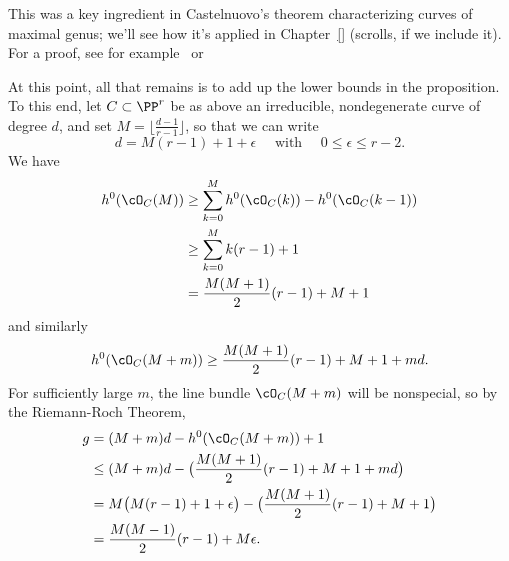 This was a key ingredient in Castelnuovo's theorem characterizing curves of maximal genus; we'll see how it's applied in Chapter~\ref{} (scrolls, if we include it). For a proof, see for example~\cite{ACGH} or~\cite{Montreal}

At this point, all that remains is to add up the lower bounds in the proposition. To this end, let $C \subset \PP^r$ be as above an irreducible, nondegenerate curve of degree $d$, and set $M = \lfloor{\frac{d-1}{r-1}}\rfloor$, so that we can write
$$
d = M(r-1) + 1 + \epsilon \quad \text{ with } \quad 0 \leq \epsilon \leq r-2.
$$
We have 
\begin{align*}
h^0(\cO_C(M)) &\geq \sum_{k=0}^M h^0(\cO_C(k)) - h^0(\cO_C(k-1)) \\
&\geq  \sum_{k=0}^M k(r-1)+1 \\
&= \frac{M(M+1)}{2}(r-1) + M + 1
\end{align*}
and similarly
$$
h^0(\cO_C(M+m)) \geq \frac{M(M+1)}{2}(r-1) + M + 1 + md.
$$
For sufficiently large $m$, the line bundle $\cO_C(M+m)$ will be nonspecial, so by the Riemann-Roch Theorem,
\begin{align*}
g &= (M+m)d - h^0(\cO_C(M+m)) + 1 \\
&\leq (M+m)d - \bigl(  \frac{M(M+1)}{2}(r-1) + M + 1 + md \bigr) \\
& = M\bigl( M(r-1) + 1 + \epsilon \bigr) - \bigl(  \frac{M(M+1)}{2}(r-1) + M + 1 \bigr) \\
&= \frac{M(M-1)}{2}(r-1) + M\epsilon.
\end{align*}


%

